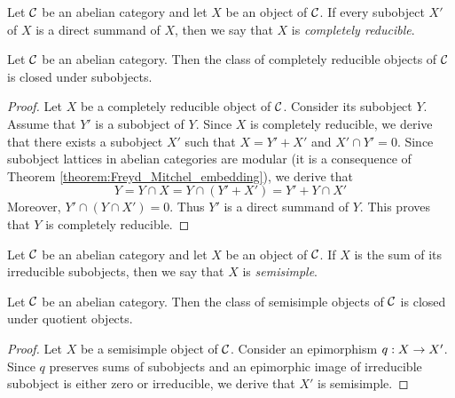 \begin{definition}
Let ${\mathcal C}$ be an abelian category and let $X$ be an object of ${\mathcal C}$. If every subobject $X'$ of $X$ is a direct summand of $X$, then we say that $X$ is \textit{completely reducible}.
\end{definition}

\begin{proposition}\label{proposition:completely_reducible_class_closed_under_subobjects}
Let ${\mathcal C}$ be an abelian category. Then the class of completely reducible objects of ${\mathcal C}$ is closed under subobjects.
\end{proposition}
\begin{proof}
Let $X$ be a completely reducible object of ${\mathcal C}$. Consider its subobject $Y$. Assume that $Y'$ is a subobject of $Y$. Since $X$ is completely reducible, we derive that there exists a subobject $X'$ such that $X = Y' + X'$ and $X'\cap Y'=0$. Since subobject lattices in abelian categories are modular (it is a consequence of Theorem \ref{theorem:Freyd_Mitchel_embedding}), we derive that
$$Y = Y\cap X = Y\cap (Y' +  X') = Y' + Y\cap X'$$
Moreover, $Y'\cap (Y\cap X')=0$. Thus $Y'$ is a direct summand of $Y$. This proves that $Y$ is completely reducible.
\end{proof}

\begin{definition}
Let ${\mathcal C}$ be an abelian category and let $X$ be an object of ${\mathcal C}$. If $X$ is the sum of its irreducible subobjects, then we say that $X$ is \textit{semisimple}.
\end{definition}

\begin{proposition}\label{proposition:semisimple_closed_under_quotients}
Let ${\mathcal C}$ be an abelian category. Then the class of semisimple objects of ${\mathcal C}$ is closed under quotient objects.
\end{proposition}
\begin{proof}
Let $X$ be a semisimple object of ${\mathcal C}$. Consider an epimorphism $q:X\rightarrow X'$. Since $q$ preserves sums of subobjects and an epimorphic image of irreducible subobject is either zero or irreducible, we derive that $X'$ is semisimple.
\end{proof}

